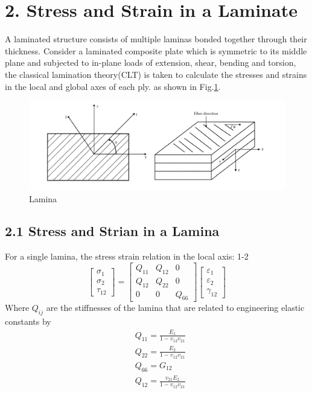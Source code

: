 \documentclass[Afour,sagev,times]{sagej}
\begin{document}
\section{2. Stress and Strain in a Laminate}
A laminated structure consists of multiple laminas bonded together through
their thickness.  Consider a laminated composite plate which is symmetric to
its middle plane and subjected to in-plane loads of extension, shear, bending
and torsion,  the classical lamination theory(CLT) is taken to calculate the
stresses and strains in the local and global axes of each ply. as shown in
Fig.\ref{fig:lamina}.

\begin{figure}
	\centering
	\includegraphics[width=\linewidth]{A_laminate_design_images/lamina_local_global_axes.png}
	\caption{Lamina}
  	\label{fig:lamina}
\end{figure}


\subsection{2.1 Stress and Strian in a Lamina}
For a single lamina, the stress strain relation in the local axis: 1-2
\begin{equation}
    \begin{bmatrix}
        \sigma_1\\
        \sigma_2\\
        \tau_{12}
    \end{bmatrix}
    =
    \begin{bmatrix}
        Q_{11} & Q_{12} & 0\\
        Q_{12} & Q_{22} & 0\\
        0      &  0     & Q_{66}
    \end{bmatrix}
    \begin{bmatrix}
        \varepsilon_1\\
        \varepsilon_2\\
		\gamma_{12}
    \end{bmatrix}
\end{equation}
Where $Q_{ij}$ are the stiffnesses of the lamina that are related to 
engineering elastic constants by
\begin{equation}
    \begin{split}
    &Q_{11}=\frac{E_1}{1-v_{12}v_{21}}\\
    &Q_{22}=\frac{E_2}{1-v_{12}v_{21}}\\
    &Q_{66}=G_{12}\\
    &Q_{12}=\frac{v_{21}E_2}{1-v_{12}v_{21}}\\
    \end{split}
\end{equation}
\end{document}
